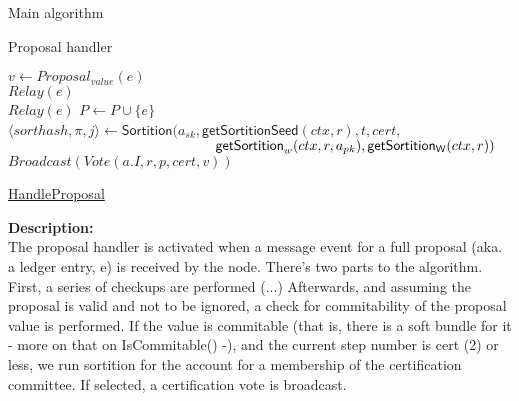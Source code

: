 \documentclass[10pt,a4paper]{article}
\begin{document}
\begin{section}{Main algorithm}


\begin{subsection}{Proposal handler}\label{ssect:HandleProposal}

    \begin{algorithm}[H]
        \begin{algorithmic}[1]

            \State $v \gets Proposal_{value}(e)$ \\

                \State $Relay(e)$
            \EndIf \\

                \State $Relay(e)$
                \State $P \gets P \cup \{e\}$ \\  %

                        \State $\langle sorthash, \pi, j\rangle\gets 
                        \mathsf{Sortition}(
                        a_{sk}, 
                        \mathsf{getSortitionSeed}(ctx, r), 
                        t, 
                        cert, $ \newline
                        ${}$ ${\hskip 5.2cm}\mathsf{getSortition}_w(ctx, r, a_{pk}), 
                        \mathsf{getSortition_W}(ctx, r)
                        )$
                            \State $Broadcast(Vote(a.I, r, p, cert, v))$
                        \EndIf
                    \EndFor    
                \EndIf

            \EndIf

        \EndFunction
        \end{algorithmic}
        \caption{\underline{HandleProposal}}
    \end{algorithm}
    
    
    \noindent \textbf{Description:}\\
The proposal handler is activated when a message event for a full proposal (aka. a ledger entry, e) is received by the node.
There's two parts to the algorithm. First, a series of checkups are performed (...)
Afterwards, and assuming the proposal is valid and not to be ignored, a check for commitability of the proposal value is performed.
If the value is commitable (that is, there is a soft bundle for it - more on that on IsCommitable() -), and the current step number
is cert (2) or less, we run sortition for the account for a membership of the certification committee.
If selected, a certification vote is broadcast.
    

\end{subsection}
\end{section}
\end{document}
